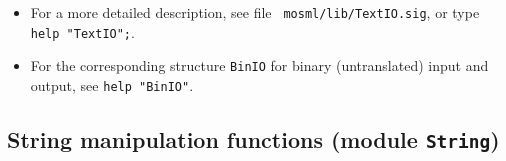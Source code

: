 \documentclass[fleqn,a4paper]{article}
\begin{document}
\begin{itemize}
\item For a more detailed description, see file {\tt
    mosml/lib/TextIO.sig}, or type {\tt help "TextIO";}.  

\item For the corresponding structure {\tt BinIO} for binary
  (untranslated) input and output, see {\tt help "BinIO"}.

\end{itemize}


\subsection*{String manipulation functions (module {\tt String})}
\end{document}
